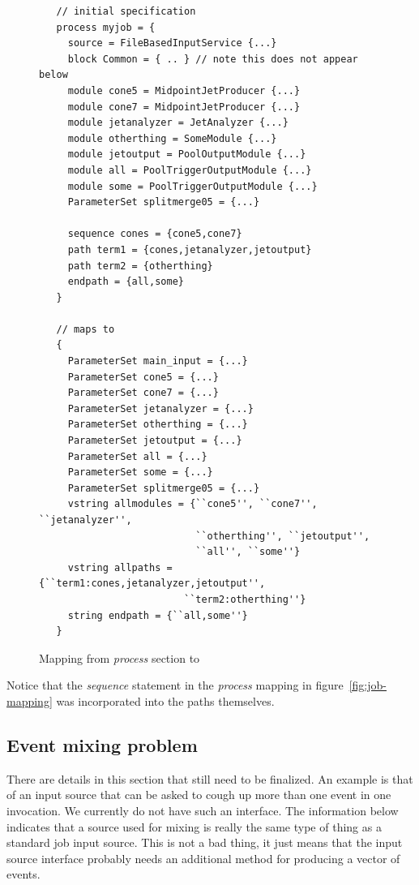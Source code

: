 \documentclass[draftmode]{memarticle}
\newcommand{\ParameterSet}{\classname{Para\-meter\-Set}}
\begin{document}
\begin{figure}[!htb]
\begin{verbatim}
   // initial specification
   process myjob = {
     source = FileBasedInputService {...}
     block Common = { .. } // note this does not appear below
     module cone5 = MidpointJetProducer {...}
     module cone7 = MidpointJetProducer {...}
     module jetanalyzer = JetAnalyzer {...}
     module otherthing = SomeModule {...}
     module jetoutput = PoolOutputModule {...}
     module all = PoolTriggerOutputModule {...}
     module some = PoolTriggerOutputModule {...}
     ParameterSet splitmerge05 = {...}

     sequence cones = {cone5,cone7}
     path term1 = {cones,jetanalyzer,jetoutput}
     path term2 = {otherthing}
     endpath = {all,some}
   }

   // maps to
   {
     ParameterSet main_input = {...}
     ParameterSet cone5 = {...}
     ParameterSet cone7 = {...}
     ParameterSet jetanalyzer = {...}
     ParameterSet otherthing = {...}
     ParameterSet jetoutput = {...}
     ParameterSet all = {...}
     ParameterSet some = {...}
     ParameterSet splitmerge05 = {...}
     vstring allmodules = {``cone5'', ``cone7'', ``jetanalyzer'',
                           ``otherthing'', ``jetoutput'', 
                           ``all'', ``some''}
     vstring allpaths = {``term1:cones,jetanalyzer,jetoutput'',
                         ``term2:otherthing''}
     string endpath = {``all,some''}
   }
\end{verbatim}
\caption{Mapping from \emph{process} section to \ParameterSet}
\label{fig:job-mapping}
\end{figure}

Notice that the \emph{sequence} statement in the 
\emph{process} mapping in figure~\vref{fig:job-mapping}
was incorporated into the paths themselves.

\subsection{Event mixing problem}

\begin{fixme}
There are details in this section that still need to be finalized.
An example is that of an input source that can be asked to cough up
more than one event in one invocation.
We currently do not have such an interface.
The information below indicates that a source used for mixing is really
the same type of thing as a standard job input source.
This is not a bad thing, it just means that the input source interface
probably needs an additional method for producing a vector of events.
\end{fixme}
\end{document}
